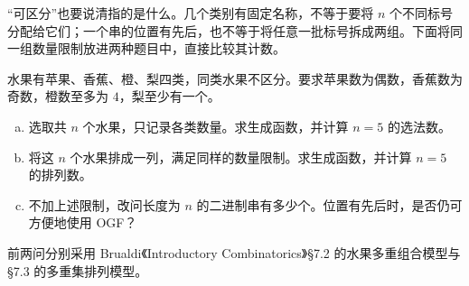\documentclass[lang=cn,a4paper,fontset=none,zihao=false,10pt,openany,twoside]{beautybook}
\numberwithin{algorithm}{chapter}
\begin{document}
“可区分”也要说清指的是什么。几个类别有固定名称，不等于要将 $n$ 个不同标号分配给它们；一个串的位置有先后，也不等于将任意一批标号拆成两组。下面将同一组数量限制放进两种题目中，直接比较其计数。
\begin{example}\label{ex:ogf-egf-choice}
水果有苹果、香蕉、橙、梨四类，同类水果不区分。要求苹果数为偶数，香蕉数为奇数，橙数至多为 $4$，梨至少有一个。
\begin{enumerate}[(a)]
\item 选取共 $n$ 个水果，只记录各类数量。求生成函数，并计算 $n=5$ 的选法数。
\item 将这 $n$ 个水果排成一列，满足同样的数量限制。求生成函数，并计算 $n=5$ 的排列数。
\item 不加上述限制，改问长度为 $n$ 的二进制串有多少个。位置有先后时，是否仍可方便地使用 OGF？
\end{enumerate}
前两问分别采用 Brualdi《Introductory Combinatorics》\S7.2 的水果多重组合模型与 \S7.3 的多重集排列模型。
\end{example}
\end{document}
